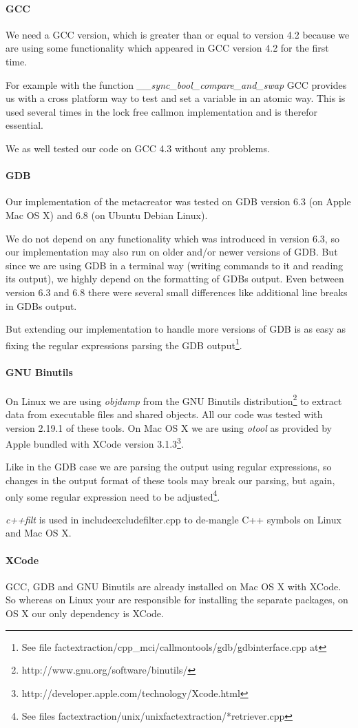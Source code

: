 \paragraph{GCC} We need a GCC version, which is greater than or equal to version 4.2 because we are using some functionality which appeared in GCC version 4.2 for the first time.

For example with the function \emph{\_\_sync\_bool\_compare\_and\_swap} GCC provides us with a cross platform way to test and set a variable in an atomic way. This is used several times in the lock free callmon implementation and is therefor essential.

We as well tested our code on GCC 4.3 without any problems.

\paragraph{GDB}

Our implementation of the metacreator was tested on GDB version 6.3 (on Apple Mac OS X) and 6.8 (on Ubuntu Debian Linux).

We do not depend on any functionality which was introduced in version 6.3, so our implementation may also run on older and/or newer versions of GDB. But since we are using GDB in a terminal way (writing commands to it and reading its output), we highly depend on the formatting of GDBs output. Even between version 6.3 and 6.8 there were several small differences like additional line breaks in GDBs output.

But extending our implementation to handle more versions of GDB is as easy as fixing the regular expressions parsing the GDB output\footnote{See file factextraction/cpp\_mci/callmontools/gdb/gdbinterface.cpp at }.

\paragraph{GNU Binutils}

On Linux we are using \emph{objdump} from the GNU Binutils distribution\footnote{http://www.gnu.org/software/binutils/} to extract data from executable files and shared objects.
All our code was tested with version 2.19.1 of these tools.  On Mac OS X we are using \emph{otool} as provided by Apple bundled with XCode version 3.1.3\footnote{http://developer.apple.com/technology/Xcode.html}.

Like in the GDB case we are parsing the output using regular expressions, so changes in the output format of these tools may break our parsing, but again, only some regular expression need to be adjusted\footnote{See files factextraction/unix/unixfactextraction/*retriever.cpp}.

\emph{c++filt} is used in includeexcludefilter.cpp to de-mangle C++ symbols on Linux and Mac OS X.

\paragraph{XCode} GCC, GDB and GNU Binutils are already installed on Mac OS X with XCode.  So whereas on Linux your are responsible for installing the separate packages, on OS X our only dependency is XCode.
